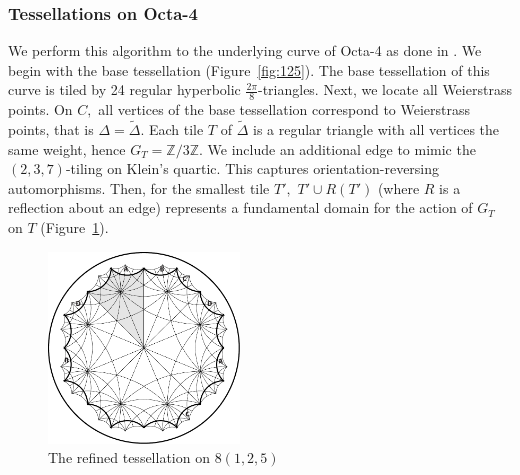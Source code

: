 \documentclass[12pt,reqno]{amsart}
\DeclareMathOperator{\Aut}{Aut}
\newcommand{\Z}{\mathbb{Z}}
\theoremstyle{definition}
\theoremstyle{remark}
\begin{document}
\subsubsection*{Tessellations on Octa-4}
We perform this algorithm to the underlying curve of Octa-4 as done in \cite{dami}. We begin with the base tessellation (Figure~\ref{fig:125}). The base tessellation of this curve is tiled by 24 regular hyperbolic $\frac{2 \pi}{8}$-triangles. Next, we locate all Weierstrass points. On $C,$ all vertices of the base tessellation correspond to Weierstrass points, that is $\Delta = \widetilde{\Delta}$. Each tile $T$ of $\widetilde{\Delta}$ is a regular triangle with all vertices the same weight, hence $G_T = \Z/ 3\Z$. We include an additional edge to mimic the $(2,3,7)$-tiling on Klein's quartic. This captures orientation-reversing automorphisms. Then, for the smallest tile $T',$ $T' \cup R(T')$ (where $R$ is a reflection about an edge) represents a fundamental domain for the action of $G_T$ on $T$ (Figure~\ref{fig:125_ref}). 







\begin{figure}[htbp] %
   \centering
   \includegraphics[width=2in]{figures/125_hyp} 
	\caption{The refined tessellation on $8(1, 2, 5)$}
	\label{fig:125_ref}
\end{figure}
\end{document}
